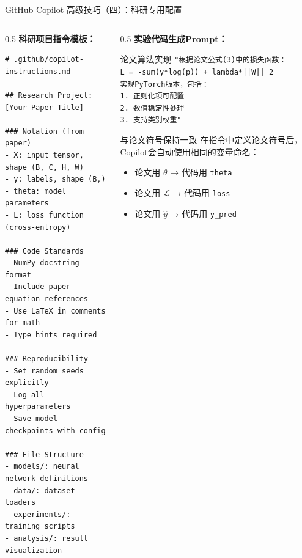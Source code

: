 \documentclass[aspectratio=169,11pt]{beamer}
\begin{document}
\begin{frame}[fragile]{GitHub Copilot 高级技巧（四）：科研专用配置}
    \begin{columns}
        \begin{column}{0.5\textwidth}
            \textbf{科研项目指令模板：}
            \begin{lstlisting}[basicstyle=\ttfamily\tiny]
# .github/copilot-instructions.md

## Research Project: [Your Paper Title]

### Notation (from paper)
- X: input tensor, shape (B, C, H, W)
- y: labels, shape (B,)
- theta: model parameters
- L: loss function (cross-entropy)

### Code Standards
- NumPy docstring format
- Include paper equation references
- Use LaTeX in comments for math
- Type hints required

### Reproducibility
- Set random seeds explicitly
- Log all hyperparameters
- Save model checkpoints with config

### File Structure
- models/: neural network definitions
- data/: dataset loaders
- experiments/: training scripts
- analysis/: result visualization
            \end{lstlisting}
        \end{column}
        \begin{column}{0.5\textwidth}
            \textbf{实验代码生成Prompt：}
            \begin{exampleblock}{论文算法实现}
                \scriptsize
                \texttt{"根据论文公式(3)中的损失函数：}\\
                \texttt{L = -sum(y*log(p)) + lambda*||W||\_2}\\
                \texttt{实现PyTorch版本，包括：}\\
                \texttt{1. 正则化项可配置}\\
                \texttt{2. 数值稳定性处理}\\
                \texttt{3. 支持类别权重"}
            \end{exampleblock}
            
            \vspace{0.2cm}
            \begin{block}{与论文符号保持一致}
                \scriptsize
                在指令中定义论文符号后，Copilot会自动使用相同的变量命名：
                \begin{itemize}
                    \item 论文用 $\theta$ → 代码用 \texttt{theta}
                    \item 论文用 $\mathcal{L}$ → 代码用 \texttt{loss}
                    \item 论文用 $\hat{y}$ → 代码用 \texttt{y\_pred}
                \end{itemize}
            \end{block}
            

\end{column}
\end{columns}
\end{frame}
\end{document}
